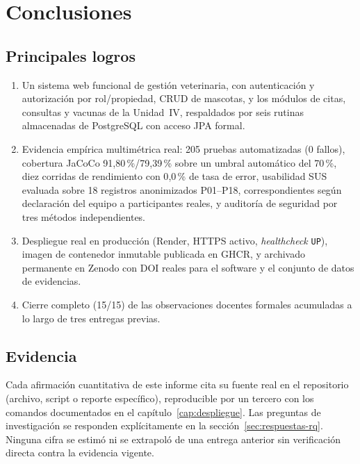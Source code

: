 \chapter{Conclusiones}
\label{cap:conclusiones-final}

\section{Principales logros}

\begin{enumerate}[nosep]
  \item Un sistema web funcional de gesti\'on veterinaria, con
    autenticaci\'on y autorizaci\'on por rol/propiedad, CRUD de mascotas, y
    los m\'odulos de citas, consultas y vacunas de la Unidad~IV,
    respaldados por seis rutinas almacenadas de PostgreSQL con acceso JPA
    formal.
  \item Evidencia emp\'irica multim\'etrica real: 205 pruebas
    automatizadas (0 fallos), cobertura JaCoCo 91{,}80\,\%/79{,}39\,\% sobre
    un umbral autom\'atico del 70\,\%, diez corridas de rendimiento con
    0{,}0\,\% de tasa de error, usabilidad SUS evaluada sobre 18 registros
    anonimizados P01--P18, correspondientes seg\'un declaraci\'on del
    equipo a participantes reales, y auditor\'ia de seguridad por tres
    m\'etodos independientes.
  \item Despliegue real en producci\'on (Render, HTTPS activo,
    \emph{healthcheck} \texttt{UP}), imagen de contenedor inmutable
    publicada en GHCR, y archivado permanente en Zenodo con DOI reales
    para el software y el conjunto de datos de evidencias.
  \item Cierre completo (15/15) de las observaciones docentes formales
    acumuladas a lo largo de tres entregas previas.
\end{enumerate}

\section{Evidencia}

Cada afirmaci\'on cuantitativa de este informe cita su fuente real en el
repositorio (archivo, script o reporte espec\'ifico), reproducible por un
tercero con los comandos documentados en el
cap\'itulo~\ref{cap:despliegue}. Las preguntas de investigaci\'on se responden
expl\'icitamente en la secci\'on~\ref{sec:respuestas-rq}. Ninguna cifra se estim\'o ni se
extrapol\'o de una entrega anterior sin verificaci\'on directa contra la
evidencia vigente.

